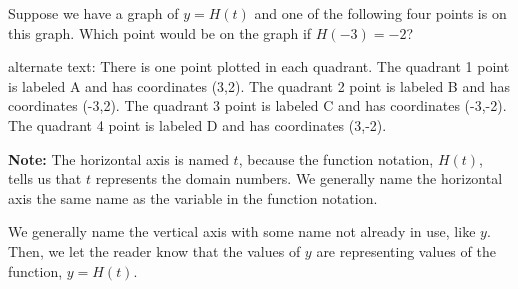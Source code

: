 \documentclass{ximera}
\begin{document}
\begin{question}

Suppose we have a graph of $y=H(t)$ and one of the following four points is on this graph. Which point would be on the graph if $H(-3) = -2$?
\begin{image}
\end{image}




\textcolor{gray!90}{alternate text: There is one point plotted in each quadrant. The quadrant 1 point is labeled A and has coordinates (3,2). The quadrant 2 point is labeled B and has coordinates (-3,2). The quadrant 3 point is labeled C and has coordinates (-3,-2). The quadrant 4 point is labeled D and has coordinates (3,-2).}







\begin{multipleChoice}
\end{multipleChoice}


\textbf{Note: } The horizontal axis is named $t$, because the function notation, $H(t)$, tells us that $t$ represents the domain numbers.  We generally name the horizontal axis the same name as the variable in the function notation.


We generally name the vertical axis with some name not already in use, like $y$.  Then, we let the reader know that the values of $y$ are representing values of the function, $y=H(t)$.
\end{question}
\end{document}
